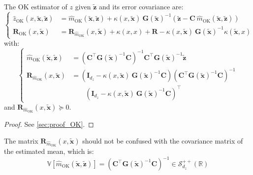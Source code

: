 \begin{proposition}\label{th:ordinary_kriging}
	The OK estimator of $z$ given $\tilde{\mathbf{z}}$ and its error covariance are:
	\begin{equation}
		\left\{\begin{aligned}
		\hat{z}_{\mathrm{OK}}(x,\tilde{\mathbf{x}},\tilde{\mathbf{z}})&=\hat{m}_{\mathrm{OK}}(\tilde{\mathbf{x}},\tilde{\mathbf{z}})+\kappa(x,\tilde{\mathbf{x}})\:\mathbf{G}(\tilde{\mathbf{x}})^{-1}\left(\tilde{\mathbf{z}}-\mathbf{C}\:\hat{m}_{\mathrm{OK}}(\tilde{\mathbf{x}},\tilde{\mathbf{z}})\right)\\
		\mathbf{R}_{\mathrm{OK}}(x,\tilde{\mathbf{x}})&=\mathbf{R}_{\hat{m}_{\mathrm{OK}}}(x,\tilde{\mathbf{x}})+\kappa(x,x)+\mathbf{R}-\kappa(x,\tilde{\mathbf{x}})\:\mathbf{G}(\tilde{\mathbf{x}})^{-1}\kappa\left(\tilde{\mathbf{x}},x\right)
		\end{aligned}\right.\label{eq:ordinary_kriging_equations}
	\end{equation}
	with:
	\begin{equation}
		\left\{\begin{aligned}
		\hat{m}_{\mathrm{OK}}(\tilde{\mathbf{x}},\tilde{\mathbf{z}})&=\left(\mathbf{C}^\top \mathbf{G}(\tilde{\mathbf{x}})^{-1}\mathbf{C}\right)^{-1}\mathbf{C}^\top \mathbf{G}(\tilde{\mathbf{x}})^{-1}\tilde{\mathbf{z}}\\
		\mathbf{R}_{\hat{m}_{\mathrm{OK}}}(x,\tilde{\mathbf{x}})&=\left(\mathbf{I}_{d_z}-\kappa(x,\tilde{\mathbf{x}})\:\mathbf{G}(\tilde{\mathbf{x}})^{-1}\mathbf{C}\right)\left(\mathbf{C}^\top \mathbf{G}(\tilde{\mathbf{x}})^{-1}\mathbf{C}\right)^{-1}\\
		&\qquad\left(\mathbf{I}_{d_z}-\kappa(x,\tilde{\mathbf{x}})\:\mathbf{G}(\tilde{\mathbf{x}})^{-1}\mathbf{C}\right)^\top
		\end{aligned}\right.
	\end{equation}
	and $\mathbf{R}_{\hat{m}_{\mathrm{OK}}}(x,\tilde{\mathbf{x}})\succeq0$.
\end{proposition}

\begin{proof}
	See \cref{sec:proof_OK}.
\end{proof}

The matrix $\mathbf{R}_{\hat{m}_{\mathrm{OK}}}(x,\tilde{\mathbf{x}})$ should not be confused with the covariance matrix of the estimated mean, which is:
\begin{equation}
	\mathbb{V}\left[\hat{m}_{\mathrm{OK}}(\tilde{\mathbf{x}},\tilde{\mathbf{z}})\right]=\left(\mathbf{C}^\top \mathbf{G}(\tilde{\mathbf{x}})^{-1}\mathbf{C}\right)^{-1}\in\mathcal{S}_{d_z}^{++}(\mathbb{R})
\end{equation}

